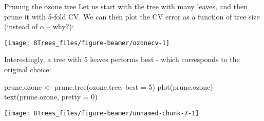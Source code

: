 \documentclass[
  10pt,
  ignorenonframetext,
]{beamer}
\newenvironment{Shaded}{\begin{snugshade}}{\end{snugshade}}
\newcommand{\AttributeTok}[1]{\textcolor[rgb]{0.77,0.63,0.00}{#1}}
\newcommand{\DecValTok}[1]{\textcolor[rgb]{0.00,0.00,0.81}{#1}}
\newcommand{\FloatTok}[1]{\textcolor[rgb]{0.00,0.00,0.81}{#1}}
\newcommand{\FunctionTok}[1]{\textcolor[rgb]{0.00,0.00,0.00}{#1}}
\newcommand{\NormalTok}[1]{#1}
\newcommand{\OtherTok}[1]{\textcolor[rgb]{0.56,0.35,0.01}{#1}}
\newcommand{\SpecialCharTok}[1]{\textcolor[rgb]{0.00,0.00,0.00}{#1}}
\newcommand{\StringTok}[1]{\textcolor[rgb]{0.31,0.60,0.02}{#1}}
\begin{document}
\begin{frame}[fragile]
\begin{block}{Pruning the ozone tree}
\protect\hypertarget{pruning-the-ozone-tree}{}
Let us start with the tree with many leaves, and then prune it with
5-fold CV. We can then plot the CV error as a function of tree size
(instead of \(\alpha\) -- why?):

\scriptsize

\begin{Shaded}
\end{Shaded}

\begin{center}\texttt{[image: 8Trees\_files/figure-beamer/ozonecv-1]} \end{center}
\end{block}
\end{frame}

\begin{frame}[fragile]
Interestingly, a tree with 5 leaves performs best - which corresponds to
the original choice:

\vspace{2mm}

\scriptsize

\begin{Shaded}
\begin{Highlighting}[]
\NormalTok{prune.ozone }\OtherTok{\textless{}{-}} \FunctionTok{prune.tree}\NormalTok{(ozone.tree, }\AttributeTok{best =} \DecValTok{5}\NormalTok{)}
\FunctionTok{plot}\NormalTok{(prune.ozone)}
\FunctionTok{text}\NormalTok{(prune.ozone, }\AttributeTok{pretty =} \DecValTok{0}\NormalTok{)}
\end{Highlighting}
\end{Shaded}

\begin{center}\texttt{[image: 8Trees\_files/figure-beamer/unnamed-chunk-7-1]} \end{center}
\end{frame}
\end{document}
